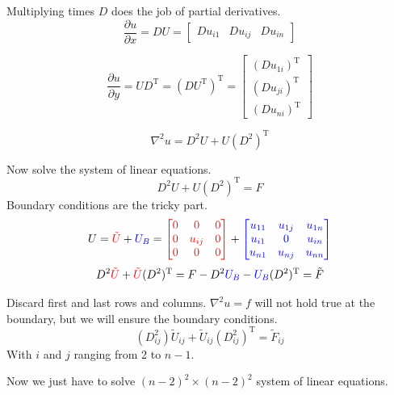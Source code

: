 \documentclass[xcolor={dvipsnames}]{beamer}
\newcommand{\trans}{\text{T}}
\begin{document}
\begin{frame}{Multiplying times $D$ does the job of partial derivatives.}{}
\begin{equation*}
\frac{\partial u}{\partial x} = DU = \begin{bmatrix}
Du_{i1} & Du_{ij} & Du_{in}
\end{bmatrix}
\end{equation*}

\pause
\begin{equation*}
\frac{\partial u}{\partial y} = UD^\trans = (DU^\trans)^\trans = \begin{bmatrix}
(Du_{1i})^\trans \\ (Du_{ji})^\trans \\ (Du_{ni})^\trans
\end{bmatrix}
\end{equation*}

\pause
\begin{equation*}
\nabla^2 u = D^2 U + U (D^2)^\trans
\end{equation*}
\end{frame}

\begin{frame}{Now solve the system of linear equations.}{}
\begin{equation*}
D^2 U + U (D^2)^\trans = F
\end{equation*}
Boundary conditions are the tricky part.
\begin{equation*}
U={\color{red}\tilde{U}}+{\color{blue}U_B}=
{\color{red}\begin{bmatrix}
0 & 0 & 0\\
0 & u_{ij} & 0\\
0 & 0 & 0
\end{bmatrix}}+
{\color{blue}\begin{bmatrix}
u_{11} & u_{1j} & u_{1n}\\
u_{i1} &    0   & u_{in}\\
u_{n1} & u_{nj} & u_{nn}\\
\end{bmatrix}}
\end{equation*}
\begin{equation*}
D^2{\color{red}\tilde{U}} + {\color{red}\tilde{U}}(D^2)^\trans = F - D^2 {\color{blue}U_B} - {\color{blue}U_B} (D^2)^\trans = \tilde{F}
\end{equation*}
\end{frame}

\begin{frame}{Discard first and last rows and columns.}{}
$\nabla^2u=f$ will not hold true at the boundary, but we will ensure the boundary conditions.
\begin{equation*}
(D^2_{ij}) \tilde{U}_{ij} + \tilde{U}_{ij} (D^2_{ij})^\trans = \tilde{F}_{ij}
\end{equation*}
With $i$ and $j$ ranging from 2 to $n-1$.

\bigskip
Now we just have to solve $(n-2)^2 \times (n-2)^2$ system of linear equations.
\end{frame}
\end{document}
